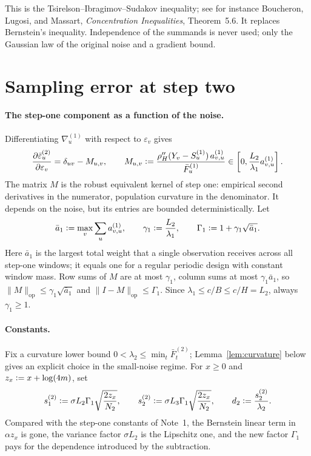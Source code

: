 \documentclass[11pt]{article}
\newcommand{\eqdef}{\mathrel{\vcentcolon=}}
\newcommand{\norm}[1]{\lVert#1\rVert}
\newcommand{\Data}{Y}
\newcommand{\IMFs}{S}
\newcommand{\IF}{F}
\newcommand{\Mop}{M}
\theoremstyle{definition}
\begin{document}
This is the Tsirelson--Ibragimov--Sudakov inequality; see for instance
Boucheron, Lugosi, and Massart, \emph{Concentration Inequalities},
Theorem~5.6.  It replaces Bernstein's inequality.  Independence of the
summands is never used; only the Gaussian law of the original noise and a
gradient bound.

\section{Sampling error at step two}\label{sec:sampling}

\paragraph{The step-one component as a function of the noise.}
Differentiating \(\nabla^{(1)}_u\) with respect to \(\varepsilon_v\) gives
\[
  \frac{\partial\bar\varepsilon^{(2)}_u}{\partial\varepsilon_v}
  =\delta_{uv}-\Mop_{u,v},
  \qquad
  \Mop_{u,v}\eqdef
  \frac{\rho_H''(\Data_v-\IMFs^{(1)}_u)\,a^{(1)}_{v,u}}{\bar\IF^{(1)}_u}
  \in\left[0,\frac{L_2}{\lambda_1}a^{(1)}_{v,u}\right].
\]
The matrix \(\Mop\) is the robust equivalent kernel of step one: empirical
second derivatives in the numerator, population curvature in the
denominator.  It depends on the noise, but its entries are bounded
deterministically.  Let
\begin{equation}
  \bar a_1\eqdef\max_v\sum_u a^{(1)}_{v,u},
  \qquad
  \gamma_1\eqdef\frac{L_2}{\lambda_1},
  \qquad
  \Gamma_1\eqdef1+\gamma_1\sqrt{\bar a_1}.
  \label{eq:amplification}
\end{equation}
Here \(\bar a_1\) is the largest total weight that a single observation
receives across all step-one windows; it equals one for a regular periodic
design with constant window mass.  Row sums of \(\Mop\) are at most
\(\gamma_1\), column sums at most \(\gamma_1\bar a_1\), so
\(\norm{\Mop}_{\mathrm{op}}\leq\gamma_1\sqrt{\bar a_1}\) and
\(\norm{I-\Mop}_{\mathrm{op}}\leq\Gamma_1\).  Since
\(\lambda_1\leq c/B\leq c/H=L_2\), always \(\gamma_1\geq1\).

\paragraph{Constants.}
Fix a curvature lower bound \(0<\lambda_2\leq\min_t\bar\IF^{(2)}_t\);
Lemma~\ref{lem:curvature} below gives an explicit choice in the small-noise
regime.  For \(x\geq0\) and \(z_x\eqdef x+\log(4m)\), set
\begin{equation}
  s^{(2)}_1\eqdef\sigma L_2\Gamma_1\sqrt{\frac{2z_x}{N_2}},
  \qquad
  s^{(2)}_2\eqdef\sigma L_3\Gamma_1\sqrt{\frac{2z_x}{N_2}},
  \qquad
  d_2\eqdef\frac{s^{(2)}_2}{\lambda_2}.
  \label{eq:step2-constants}
\end{equation}
Compared with the step-one constants of Note~1, the Bernstein linear term
in \(\alpha z_x\) is gone, the variance factor \(\sigma L_2\) is the
Lipschitz one, and the new factor \(\Gamma_1\) pays for the dependence
introduced by the subtraction.
\end{document}
